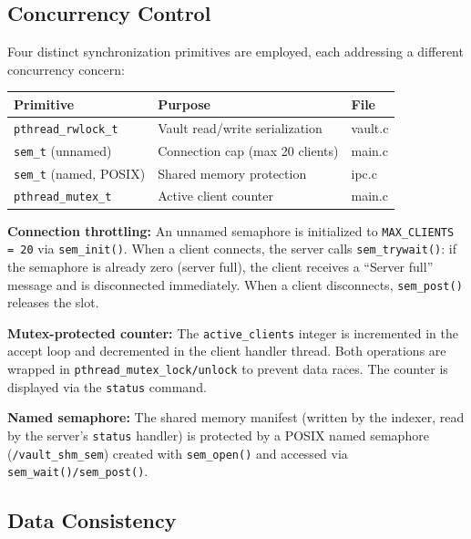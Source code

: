 \documentclass[12pt,a4paper]{article}
\begin{document}
\subsection{Concurrency Control}

Four distinct synchronization primitives are employed, each addressing a different
concurrency concern:

\begin{table}[H]
\centering
\begin{tabular}{@{}lll@{}}
\toprule
\textbf{Primitive} & \textbf{Purpose} & \textbf{File} \\
\midrule
\texttt{pthread\_rwlock\_t}       & Vault read/write serialization  & vault.c \\[0.2em]
\texttt{sem\_t} (unnamed)         & Connection cap (max 20 clients) & main.c \\[0.2em]
\texttt{sem\_t} (named, POSIX)    & Shared memory protection        & ipc.c \\[0.2em]
\texttt{pthread\_mutex\_t}        & Active client counter           & main.c \\
\bottomrule
\end{tabular}
\end{table}

\textbf{Connection throttling:} An unnamed semaphore is initialized to
\texttt{MAX\_CLIENTS = 20} via \texttt{sem\_init()}. When a client connects, the
server calls \texttt{sem\_trywait()}: if the semaphore is already zero (server full),
the client receives a ``Server full'' message and is disconnected immediately.
When a client disconnects, \texttt{sem\_post()} releases the slot.

\textbf{Mutex-protected counter:} The \texttt{active\_clients} integer is
incremented in the accept loop and decremented in the client handler thread.
Both operations are wrapped in \texttt{pthread\_mutex\_lock/unlock} to prevent
data races. The counter is displayed via the \texttt{status} command.

\textbf{Named semaphore:} The shared memory manifest (written by the indexer,
read by the server's \texttt{status} handler) is protected by a POSIX named
semaphore (\texttt{/vault\_shm\_sem}) created with \texttt{sem\_open()} and
accessed via \texttt{sem\_wait()/sem\_post()}.

\subsection{Data Consistency}
\end{document}
